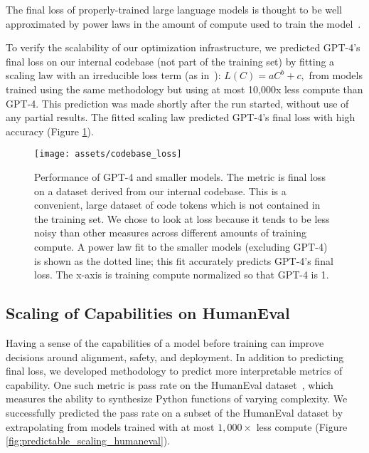 \documentclass{article}
\begin{document}
The final loss of properly-trained large language models is thought to be well approximated by power laws in the amount of compute used to train the model~\citep{hestness2017deep, thompson2020computational, hoffmann2022training,kaplan2020scaling,henighan2020scaling}.

To verify the scalability of our optimization infrastructure, we predicted GPT-4’s final loss on our internal codebase (not part of the training set) by fitting a scaling law with an irreducible loss term (as in~\citet{henighan2020scaling}): $L(C) = aC^b + c,$ from models trained using the same methodology but using at most 10,000x less compute than GPT-4. This prediction was made shortly after the run started, without use of any partial results. The fitted scaling law predicted GPT-4's final loss with high accuracy (Figure \ref{fig:predictable_scaling_loss}). 

\begin{figure}[htbp]
    \centering
    \texttt{[image: assets/codebase\_loss]}
    \caption{Performance of GPT-4 and smaller models. The metric is final loss on a dataset derived from our internal codebase. This is a convenient, large dataset of code tokens which is not contained in the training set. We chose to look at loss because it tends to be less noisy than other measures across different amounts of training compute. A power law fit to the smaller models (excluding GPT-4) is shown as the dotted line; this fit accurately predicts GPT-4's final loss. The x-axis is training compute normalized so that GPT-4 is 1.
    }
    \label{fig:predictable_scaling_loss}
\end{figure}

\subsection{Scaling of Capabilities on HumanEval}


Having a sense of the capabilities of a model before training can improve decisions around alignment, safety, and deployment. In addition to predicting final loss, we developed methodology to predict more interpretable metrics of capability. One such metric is pass rate on the HumanEval dataset~\citep{chen2021codex}, which measures the ability to synthesize Python functions of varying complexity. We successfully predicted the pass rate on a subset of the HumanEval dataset by extrapolating from models trained with at most $1,000\times$ less compute (Figure \ref{fig:predictable_scaling_humaneval}).
\end{document}

